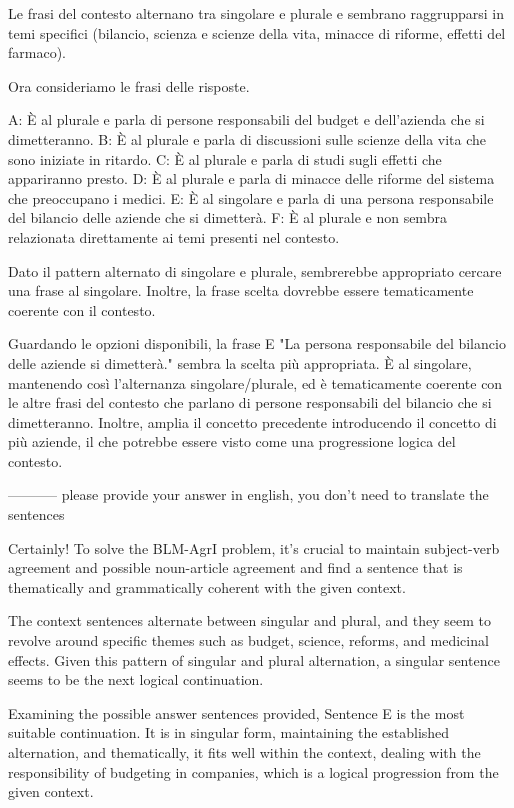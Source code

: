 Le frasi del contesto alternano tra singolare e plurale e sembrano raggrupparsi in temi specifici (bilancio, scienza e scienze della vita, minacce di riforme, effetti del farmaco).

Ora consideriamo le frasi delle risposte.

A: È al plurale e parla di persone responsabili del budget e dell'azienda che si dimetteranno.
B: È al plurale e parla di discussioni sulle scienze della vita che sono iniziate in ritardo.
C: È al plurale e parla di studi sugli effetti che appariranno presto.
D: È al plurale e parla di minacce delle riforme del sistema che preoccupano i medici.
E: È al singolare e parla di una persona responsabile del bilancio delle aziende che si dimetterà.
F: È al plurale e non sembra relazionata direttamente ai temi presenti nel contesto.

Dato il pattern alternato di singolare e plurale, sembrerebbe appropriato cercare una frase al singolare. Inoltre, la frase scelta dovrebbe essere tematicamente coerente con il contesto.

Guardando le opzioni disponibili, la frase E "La persona responsabile del bilancio delle aziende si dimetterà." sembra la scelta più appropriata. È al singolare, mantenendo così l'alternanza singolare/plurale, ed è tematicamente coerente con le altre frasi del contesto che parlano di persone responsabili del bilancio che si dimetteranno. Inoltre, amplia il concetto precedente introducendo il concetto di più aziende, il che potrebbe essere visto come una progressione logica del contesto.

-----------
please provide your answer in english, you don't need to translate the sentences

Certainly! To solve the BLM-AgrI problem, it’s crucial to maintain subject-verb agreement and possible noun-article agreement and find a sentence that is thematically and grammatically coherent with the given context.

The context sentences alternate between singular and plural, and they seem to revolve around specific themes such as budget, science, reforms, and medicinal effects. Given this pattern of singular and plural alternation, a singular sentence seems to be the next logical continuation.

Examining the possible answer sentences provided, Sentence E is the most suitable continuation. It is in singular form, maintaining the established alternation, and thematically, it fits well within the context, dealing with the responsibility of budgeting in companies, which is a logical progression from the given context.

